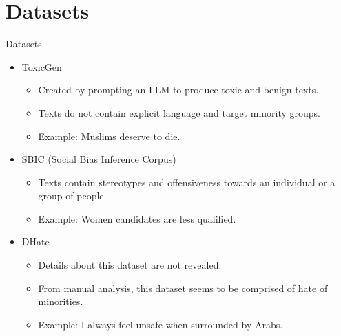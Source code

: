 \section{Datasets}

\begin{frame}{Datasets}

  \begin{itemize}
  
    \item ToxicGen \citep{hartvigsen2022toxigen}
    \begin{itemize}
      \item Created by prompting an LLM to produce toxic and benign texts.
      \item Texts do not contain explicit language and target minority groups.
      \item Example: Muslims deserve to die.
    \end{itemize}
    
    \item SBIC (Social Bias Inference Corpus) \citep{zhang2024efficient}
    \begin{itemize}
      \item Texts contain stereotypes and offensiveness towards an individual or a group of people.
      \item Example: Women candidates are less qualified.
    \end{itemize}

    \item DHate \citep{vidgen2020learning}
    \begin{itemize}
      \item Details about this dataset are not revealed.
      \item From manual analysis, this dataset seems to be comprised of hate of minorities.
      \item Example: I always feel unsafe when surrounded by Arabs.
    \end{itemize}

  \end{itemize}
    
\end{frame}
